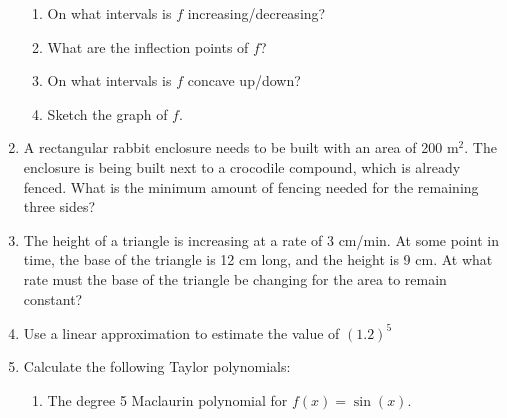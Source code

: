 \documentclass[12pt]{article}
\newcommand{\points}[1]{\marginpar{\hspace{24pt}[#1]}}
\begin{document}
\begin{enumerate}
\begin{enumerate}
  
  \item On what intervals is $f$ increasing/decreasing? \points{1}
  
  
  \item What are the inflection points of $f$?  \points{1}
  
  
  \item On what intervals is $f$ concave up/down? \points{1}
  

   \item Sketch the graph of $f$. \points{4}
 
  \end{enumerate}
 
  \item  A rectangular rabbit enclosure needs to be built with an area of 200 $\text{m}^2$. The enclosure is being built next to a crocodile compound, which is already fenced. \points{5} What is the minimum amount of fencing needed for the remaining three sides?
  
  
  \item The height of a triangle is increasing at a rate of 3 cm/min. At some point in time, the base of the \points{5} triangle is 12 cm long, and the height is 9 cm. At what rate must the base of the triangle be changing for the area to remain constant? 
  
  
  
  
  
  
  \item Use a linear approximation to estimate the value of $(1.2)^5$ \points{3}
  
  
  
  \item Calculate the following Taylor polynomials:
  \begin{enumerate}
  \item The degree 5 Maclaurin polynomial for $f(x)=\sin(x)$. \points{3}
  
  

\end{enumerate}
\end{enumerate}
\end{document}
